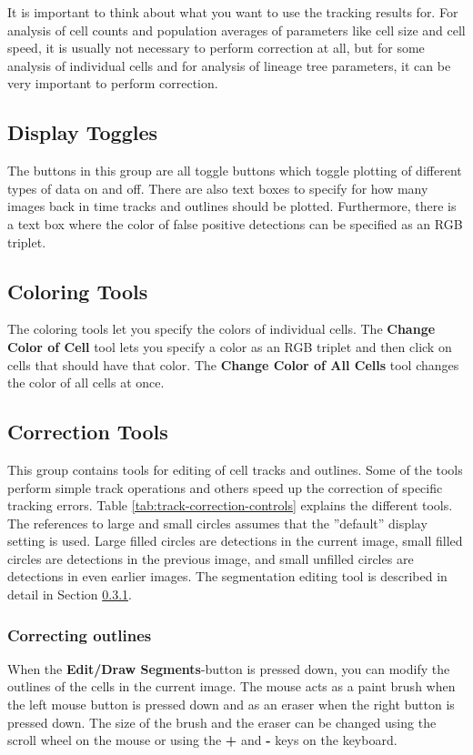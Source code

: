 \documentclass[a4paper, oneside, onecolumn, 11pt]{article}
\newcommand{\setting}[1]{''#1''}
\newcommand{\control}[1]{\textbf{#1}}
\begin{document}
It is important to think about what you want to use the tracking results for. For analysis of cell counts and population averages of parameters like cell size and cell speed, it is usually not necessary to perform correction at all, but for some analysis of individual cells and for analysis of lineage tree parameters, it can be very important to perform correction.

\subsection{Display Toggles}
\label{sec:display-toggles}
The buttons in this group are all toggle buttons which toggle plotting of different types of data on and off. There are also text boxes to specify for how many images back in time tracks and outlines should be plotted. Furthermore, there is a text box where the color of false positive detections can be specified as an RGB triplet.

\subsection{Coloring Tools}
\label{sec:coloring-tools}
The coloring tools let you specify the colors of individual cells. The \control{Change Color of Cell} tool lets you specify a color as an RGB triplet and then click on cells that should have that color. The \control{Change Color of All Cells} tool changes the color of all cells at once.

\subsection{Correction Tools}
\label{sec:correction-tools}
This group contains tools for editing of cell tracks and outlines. Some of the tools perform simple track operations and others speed up the correction of specific tracking errors. Table \ref{tab:track-correction-controls} explains the different tools. The references to large and small circles assumes that the \setting{default} display setting is used. Large filled circles are detections in the current image, small filled circles are detections in the previous image, and small unfilled circles are detections in even earlier images. The segmentation editing tool is described in detail in Section \ref{sec:correcting-outlines}.


\subsubsection{Correcting outlines}
\label{sec:correcting-outlines}
When the \control{Edit/Draw Segments}-button is pressed down, you can modify the outlines of the cells in the current image. The mouse acts as a paint brush when the left mouse button is pressed down and as an eraser when the right button is pressed down. The size of the brush and the eraser can be changed using the scroll wheel on the mouse or using the \control{+} and \control{-} keys on the keyboard.
\end{document}

